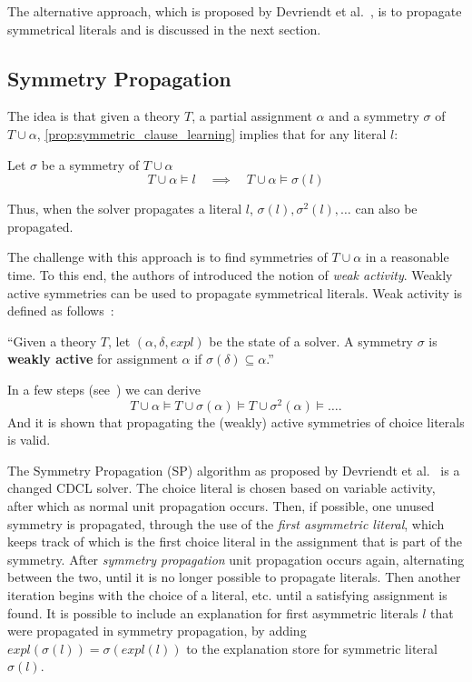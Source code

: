 	The alternative approach, which is proposed by Devriendt et al.~\cite{devriendt2012symmetry},
	is to propagate symmetrical literals and is discussed in the next section.

\subsection{Symmetry Propagation}
	The idea is that given a theory $T$, a partial assignment $\alpha$ and a symmetry
	$\sigma$ of $T \cup \alpha$, \cref{prop:symmetric_clause_learning} implies
	that for any literal $l$:\\

	\begin{proposition}
		\label{prop:symmetryPropagation}
		Let $\sigma$ be a symmetry of $T \cup \alpha$
		\begin{equation*}
			T \cup \alpha \models l \quad
			\implies
			\quad T \cup \alpha \models \sigma(l)
		\end{equation*}
	\end{proposition}
	Thus, when the solver propagates a literal $l$, $\sigma(l), \sigma^2(l),\dots$ can also be propagated.

	The challenge with this approach is to find symmetries of $T \cup \alpha$ in a
	reasonable time.
	To this end, the authors of \cite{devriendt2012symmetry} introduced the notion of
	\emph{weak activity}.
	Weakly active symmetries can be used to propagate symmetrical literals.
	Weak activity is defined as follows~\cite{devriendt2012symmetry}:
	\begin{definition}
		\label{def:weaklyActive}
		``Given a theory $T$, let $(\alpha, \delta, expl)$ be the state of a solver.
		A symmetry $\sigma$ is \textbf{weakly active} for  assignment $\alpha$ if
		$\sigma(\delta)\subseteq \alpha$.''
	\end{definition}
	In a few steps (see~\cite{devriendt2012symmetry}) we can derive
	\begin{equation}
		T\cup \alpha \models T \cup \sigma(\alpha) \models T \cup \sigma^2(\alpha) \models \dots.
	\end{equation}
	And it is shown that propagating the (weakly) active symmetries of choice literals is valid.

	The Symmetry Propagation (SP) algorithm as proposed by Devriendt et
	al.~\cite{devriendt2012symmetry} is a changed CDCL solver.
	The choice literal is chosen based on variable activity, after which as normal unit propagation
	occurs.
	Then, if possible, one unused symmetry is propagated, through the use of the \emph{first
	asymmetric literal}, which keeps track of which is the first choice literal in the assignment
	that is part of the symmetry.
	After \emph{symmetry propagation} unit propagation occurs again, alternating between the two,
	until it is no longer possible to propagate literals.
	Then another iteration begins with the choice of a literal, etc. until a satisfying assignment
	is found.
	It is possible to include an explanation for first asymmetric literals $l$ that were propagated
	in symmetry propagation,
	by adding $expl(\sigma(l)) = \sigma(expl(l))$ to the explanation store for symmetric literal
	$\sigma(l)$.

